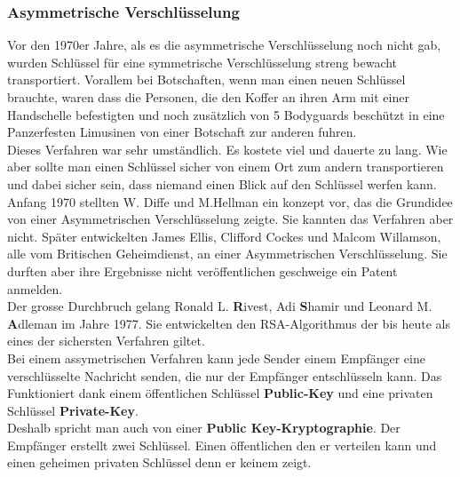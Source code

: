 \subsubsection{Asymmetrische Verschlüsselung}
Vor den 1970er Jahre, als es die asymmetrische Verschlüsselung noch nicht gab, wurden Schlüssel für eine symmetrische Verschlüsselung streng bewacht transportiert.
Vorallem bei Botschaften, wenn man einen neuen Schlüssel brauchte, waren dass die Personen, die den Koffer an ihren Arm mit einer Handschelle befestigten und noch zusätzlich von 5 Bodyguards beschützt in eine Panzerfesten Limusinen von einer Botschaft zur anderen fuhren.\\
Dieses Verfahren war sehr umständlich. Es kostete viel und dauerte zu lang. Wie aber sollte man einen Schlüssel sicher von einem Ort zum andern transportieren und dabei sicher sein, dass niemand einen Blick auf den Schlüssel werfen kann.\\
Anfang 1970 stellten W. Diffe und M.Hellman ein konzept vor, das die Grundidee von einer Asymmetrischen Verschlüsselung zeigte. Sie kannten das Verfahren aber nicht.
Später entwickelten James Ellis, Clifford Cockes und Malcom Willamson, alle vom Britischen Geheimdienst, an einer Asymmetrischen Verschlüsselung. Sie durften aber ihre Ergebnisse nicht veröffentlichen geschweige ein Patent anmelden.\\
Der grosse Durchbruch gelang Ronald L. \textbf{R}ivest, Adi \textbf{S}hamir und Leonard M. \textbf{A}dleman im Jahre 1977. Sie entwickelten den RSA-Algorithmus der bis heute als eines der sichersten Verfahren giltet.\\[2ex]
%
Bei einem assymetrischen Verfahren kann jede Sender einem Empfänger eine verschlüsselte Nachricht senden, die nur der Empfänger entschlüsseln kann. Das Funktioniert dank einem öffentlichen Schlüssel \textbf{Public-Key} und eine privaten Schlüssel \textbf{Private-Key}. \\
Deshalb spricht man auch von einer  \textbf{Public Key-Kryptographie}.
Der Empfänger erstellt zwei Schlüssel. Einen öffentlichen den er verteilen kann und einen geheimen privaten Schlüssel denn er keinem zeigt. 

